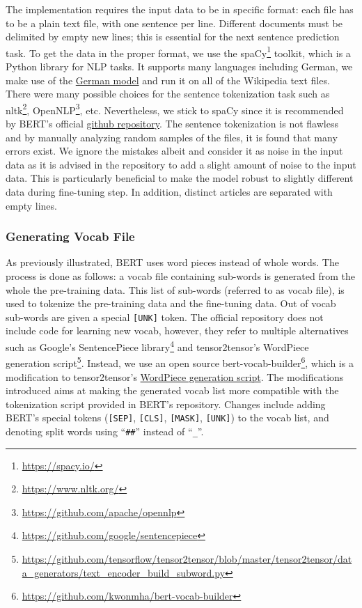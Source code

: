 The implementation requires the input data to be in specific format: each file has to be a plain text file, with one sentence per line. Different documents must be delimited by empty new lines; this is essential for the next sentence prediction task.
To get the data in the proper format, we use the spaCy\footnote{\url{https://spacy.io/}} toolkit, which is a Python library for \ac{NLP} tasks. It supports many languages including German, we make use of the \href{https://spacy.io/models/de}{German model} and run it on all of the Wikipedia text files. There were many possible choices for the sentence tokenization task such as nltk\footnote{\url{https://www.nltk.org/}}, OpenNLP\footnote{\url{https://github.com/apache/opennlp}}, etc. Nevertheless, we stick to spaCy since it is recommended by \ac{BERT}'s official \href{https://github.com/google-research/bert}{github repository}. The sentence tokenization is not flawless and by manually analyzing random samples of the files, it is found that many errors exist. We ignore the mistakes albeit and consider it as noise in the input data as it is advised in the repository to add a slight amount of noise to the input data. This is particularly beneficial to make the model robust to slightly different data during fine-tuning step. In addition, distinct articles are separated with empty lines.

\subsubsection{Generating Vocab File}
\label{meth:s5_sub3_subsub2}

As previously illustrated, \ac{BERT} uses word pieces instead of whole words. The process is done as follows: a vocab file containing sub-words is generated from the whole the pre-training data. This list of sub-words (referred to as vocab file), is used to tokenize the pre-training data and the fine-tuning data. Out of vocab sub-words are given a special \texttt{[UNK]} token. The official repository does not include code for learning new vocab, however, they refer to multiple alternatives such as Google's SentencePiece library\footnote{\url{https://github.com/google/sentencepiece}} and tensor2tensor's WordPiece generation script\footnote{\url{https://github.com/tensorflow/tensor2tensor/blob/master/tensor2tensor/data_generators/text_encoder_build_subword.py}}. Instead, we use an open source bert-vocab-builder\footnote{\url{https://github.com/kwonmha/bert-vocab-builder}}, which is a modification to tensor2tensor's \href{https://github.com/tensorflow/tensor2tensor/blob/master/tensor2tensor/data_generators/text_encoder_build_subword.py}{WordPiece generation script}. The modifications introduced aims at making the generated vocab list more compatible with the tokenization script provided in \ac{BERT}'s repository. Changes include adding \ac{BERT}'s special tokens (\texttt{[SEP]}, \texttt{[CLS]}, \texttt{[MASK]}, \texttt{[UNK]}) to the vocab list, and denoting split words using \enquote{\texttt{\#\#}} instead of \enquote{\texttt{\_}}. 

